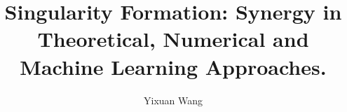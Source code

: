 \documentclass[12pt]{caltech_thesis}
\numberwithin{equation}{section}
\begin{document}
\title{Singularity Formation: Synergy in Theoretical, Numerical and Machine Learning Approaches.}
\author{Yixuan Wang}

\address{Pasadena, California}                     %



\maketitle[logo]
\end{document}
